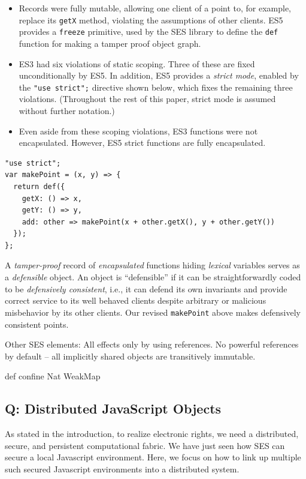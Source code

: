 \documentclass{llncs}
\begin{document}
\begin{itemize}
\item Records were fully mutable, allowing one client of a point to, for example, replace its {\tt getX} method, violating the assumptions of other clients. ES5 provides a {\tt freeze} primitive, used by the SES library to define the {\tt def} function for making a tamper proof object graph.
\item ES3 had six violations of static scoping. Three of these are fixed unconditionally by ES5. In addition, ES5 provides a \emph{strict mode}, enabled by the {\tt "use strict";} directive shown below, which fixes the remaining three violations. (Throughout the rest of this paper, strict mode is assumed without further notation.)  
\item Even aside from these scoping violations, ES3 functions were not encapsulated. However, ES5 strict functions are fully encapsulated.
\end{itemize}

\begin{verbatim}
"use strict";
var makePoint = (x, y) => {
  return def({
    getX: () => x,
    getY: () => y,
    add: other => makePoint(x + other.getX(), y + other.getY())
  });
};
\end{verbatim}

A \emph{tamper-proof} record of \emph{encapsulated} functions hiding \emph{lexical} variables serves as a \emph{defensible} object. An object is ``defensible'' if it can be straightforwardly coded to be \emph{defensively consistent}\cite{RobustComposition}, i.e., it can defend its own invariants and provide correct service to its well behaved clients despite arbitrary or malicious misbehavior by its other clients. Our revised {\tt makePoint} above makes defensively consistent points.

Other SES elements: 
All effects only by using references.
No powerful references by default -- all implicitly shared objects are transitively immutable. 

def
confine
Nat
WeakMap

\subsection{Q: Distributed JavaScript Objects}

As stated in the introduction, to realize electronic rights, we need a distributed, secure, and persistent computational fabric. We have just seen how SES can secure a local Javascript environment. Here, we focus on how to link up multiple such secured Javascript environments into a distributed system.
\end{document}
